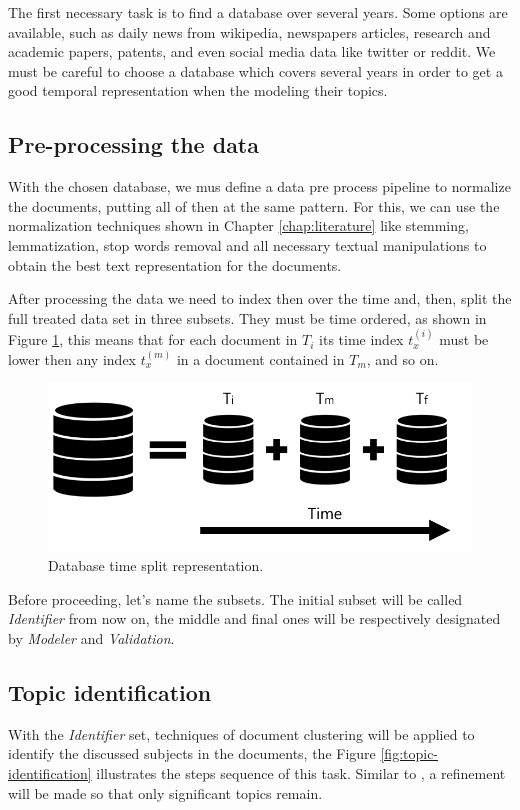 The first necessary task is to find a database over several years. 
Some options are available, such as daily news from wikipedia, newspapers articles, research and academic papers, patents, and even social media data like twitter or reddit.
We must be careful to choose a database which covers several years in order to get a good temporal representation when the modeling their topics.

\subsection{Pre-processing the data}

With the chosen database, we mus define a data pre process pipeline to normalize the documents, putting all of then at the same pattern. For this, we can use the normalization techniques shown in Chapter \ref{chap:literature} like stemming, lemmatization, stop words removal and all necessary textual manipulations to obtain the best text representation for the documents.

After processing the data we need to index then over the time and, then, split the full treated data set in three subsets. They must be time ordered, as shown in Figure \ref{fig:database}, this means that for each document in $T_{i}$ its time index $t_{x}^{(i)}$ must be lower then any index $t_{x}^{(m)}$ in a document contained in $T_{m}$, and so on.

\begin{figure}[h!]
	\centering
	\includegraphics[width=0.5\linewidth]{01.Chapters/04.Materials/database}
	\caption{Database time split representation.}
	\label{fig:database}
\end{figure}

Before proceeding, let's name the subsets. The initial subset will be called \textit{Identifier} from now on, the middle and final ones will be respectively designated by \textit{Modeler} and \textit{Validation}. 

\subsection{Topic identification}

With the \textit{Identifier} set, techniques of document clustering will be applied to identify the  discussed subjects in the documents, the Figure \ref{fig:topic-identification} illustrates the steps sequence of this task. Similar to , a refinement will be made so that only significant topics remain. 

